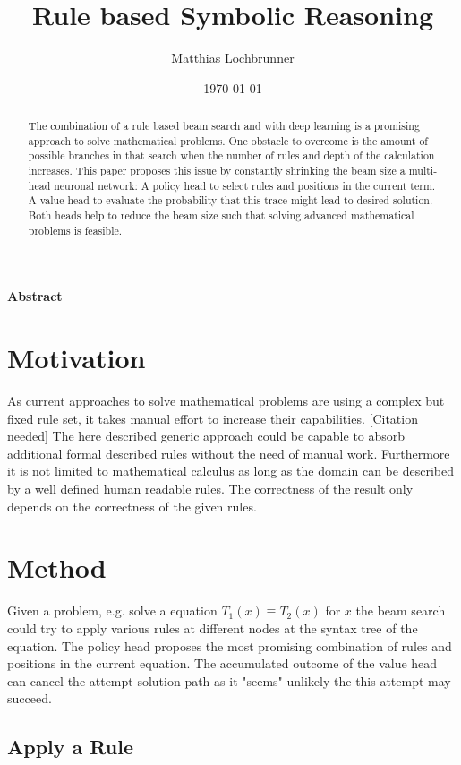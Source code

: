 \documentclass{scrartcl}
\title{Rule based Symbolic Reasoning}
\author{Matthias Lochbrunner}
\date{\today}
\theoremstyle{definition}
\begin{document}
\maketitle
\begin{center}
	\textbf{Abstract}
\end{center}
\begin{abstract}
	The combination of a rule based beam search and with deep learning is a promising approach to solve mathematical problems.
	One obstacle to overcome is the amount of possible branches in that search when the number of rules and depth of the calculation increases.
	This paper proposes this issue by constantly shrinking the beam size a multi-head neuronal network:
	A policy head to select rules and positions in the current term. A value head to evaluate the probability that this trace might lead to desired solution.
	Both heads help to reduce the beam size such that solving advanced mathematical problems is feasible.
\end{abstract}

\section{Motivation}

As current approaches to solve mathematical problems are using a complex but fixed rule set, it takes manual effort to increase their capabilities. [Citation needed]
The here described generic approach could be capable to absorb additional formal described rules without the need of manual work.
Furthermore it is not limited to mathematical calculus as long as the domain can be described by a well defined human readable rules.
The correctness of the result only depends on the correctness of the given rules.

\section{Method}

Given a problem, e.g. solve a equation $T_1\left(x\right)\equiv T_2\left(x\right)$ for $x$ the beam search could try to apply various rules at different nodes at the syntax tree of the equation.
The policy head proposes the most promising combination of rules and positions in the current equation.
The accumulated outcome of the value head can cancel the attempt solution path as it "seems" unlikely the this attempt may succeed.

\subsection{Apply a Rule}
\end{document}
